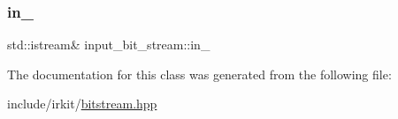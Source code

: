 \mbox{\label{classinput__bit__stream_a276979d5f49658e7aed99199e42ecc2d}} 
\subsubsection{\texorpdfstring{in\+\_\+}{in\_}}
{\footnotesize\ttfamily std\+::istream\& input\+\_\+bit\+\_\+stream\+::in\+\_\+\hspace{0.3cm}{\ttfamily [protected]}}



The documentation for this class was generated from the following file\+:\begin{DoxyCompactItemize}
\item 
include/irkit/\mbox{\hyperlink{bitstream_8hpp}{bitstream.\+hpp}}\end{DoxyCompactItemize}
